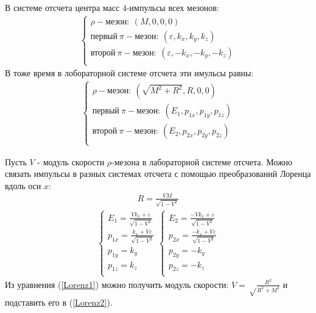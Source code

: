 \documentclass[12pt]{article}
\begin{document}
В системе отсчета центра масс 4-импульсы всех мезонов:
\begin{gather*}
	\begin{cases}
		\rho-\text{мезон}:\ (M, 0, 0, 0) \\
		\text{первый}\ \pi-\text{мезон}:\ (\varepsilon, k_x, k_y, k_z) \\
		\text{второй}\ \pi-\text{мезон}:\ (\varepsilon, -k_x, -k_y, -k_z) \\
	\end{cases}
\end{gather*}
В тоже время в лобораторной системе отсчета эти имульсы равны:  
\begin{gather*}
	\begin{cases}
		\rho-\text{мезон}:\ (\sqrt{M^2 + R^2}, R, 0, 0) \\
		\text{первый}\ \pi-\text{мезон}:\ (E_1, p_{1x}, p_{1y}, p_{1z}) \\
		\text{второй}\ \pi-\text{мезон}:\ (E_2, p_{2x}, p_{2y}, p_{2z}) \\
	\end{cases}
\end{gather*}

Пусть $V$ - модуль скорости $\rho$-мезона в лабораторной системе отсчета.  
Можно связать импульсы в разных системах отсчета с помощью преобразований Лоренца вдоль оси $x$:
\begin{gather}
	\label{Lorenz1}
	R = \frac{VM}{\sqrt{1 - V^2}}
\end{gather}
\begin{gather}
	\label{Lorenz2}
	\begin{cases}
		E_1 = \frac{V k_x + \varepsilon}{\sqrt{1 - V^2}} \\
		p_{1x} = \frac{k_x + V\varepsilon}{\sqrt{1 - V^2}} \\
		p_{1y} = k_y \\
		p_{1z} = k_z \\
	\end{cases}
	\begin{cases}
		E_2 = \frac{-V k_x + \varepsilon}{\sqrt{1 - V^2}} \\
		p_{2x} = \frac{-k_x + V\varepsilon}{\sqrt{1 - V^2}} \\
		p_{2y} = -k_y \\
		p_{2z} = -k_z \\
	\end{cases}
\end{gather}
Из уравнения (\ref{Lorenz1}) можно получить модуль скорости: $V = \sqrt\frac{R^2}{R^2 + M^2}$ и подставить его в (\ref{Lorenz2}).
\end{document}
